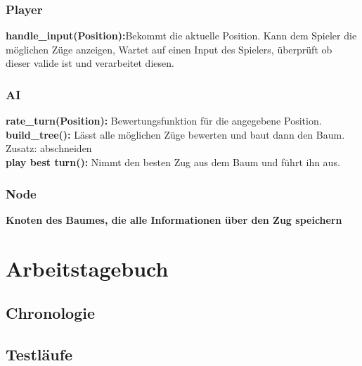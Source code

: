 \documentclass{article}
\begin{document}
\subsubsection{Player}

\textbf{handle\_input(Position):}Bekommt die aktuelle Position. Kann dem Spieler die möglichen Züge anzeigen, Wartet auf einen Input des Spielers, überprüft ob dieser valide
ist und verarbeitet diesen. \\

\subsubsection{AI}
\textbf{rate\_turn(Position):} Bewertungsfunktion für die angegebene Position. \\
\textbf{build\_tree():} Lässt alle möglichen Züge bewerten und baut dann den Baum. \\
Zusatz: abschneiden \\
\textbf{play best turn():} Nimmt den besten Zug aus dem Baum und führt ihn aus. \\

\subsubsection{Node}
\textbf{Knoten des Baumes, die alle Informationen über den Zug speichern}


\newpage
\section{Arbeitstagebuch}\label{section-diary}

\subsection{Chronologie}
\subsection{Testläufe}


\end{document}
